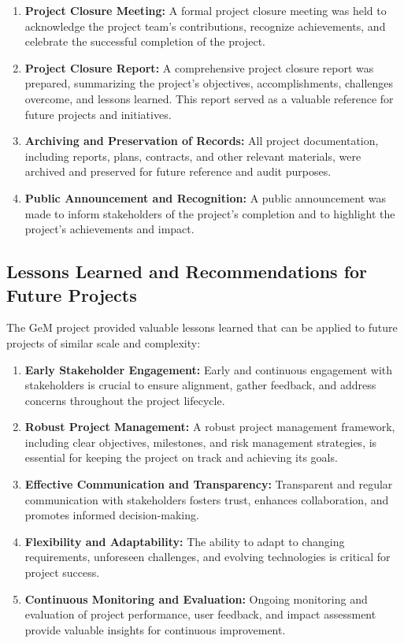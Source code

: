 \begin{enumerate}
    \item \textbf{Project Closure Meeting:} A formal project closure meeting was held to acknowledge the project team's contributions, recognize achievements, and celebrate the successful completion of the project.
    
    \item \textbf{Project Closure Report:} A comprehensive project closure report was prepared, summarizing the project's objectives, accomplishments, challenges overcome, and lessons learned. This report served as a valuable reference for future projects and initiatives.
    
    \item \textbf{Archiving and Preservation of Records:} All project documentation, including reports, plans, contracts, and other relevant materials, were archived and preserved for future reference and audit purposes.
    
    \item \textbf{Public Announcement and Recognition:} A public announcement was made to inform stakeholders of the project's completion and to highlight the project's achievements and impact.
\end{enumerate}

\subsection{Lessons Learned and Recommendations for Future Projects}

The GeM project provided valuable lessons learned that can be applied to future projects of similar scale and complexity:

\begin{enumerate}
    \item \textbf{Early Stakeholder Engagement:} Early and continuous engagement with stakeholders is crucial to ensure alignment, gather feedback, and address concerns throughout the project lifecycle.
    
    \item \textbf{Robust Project Management:} A robust project management framework, including clear objectives, milestones, and risk management strategies, is essential for keeping the project on track and achieving its goals.
    
    \item \textbf{Effective Communication and Transparency:} Transparent and regular communication with stakeholders fosters trust, enhances collaboration, and promotes informed decision-making.
    
    \item \textbf{Flexibility and Adaptability:} The ability to adapt to changing requirements, unforeseen challenges, and evolving technologies is critical for project success.
    
    \item \textbf{Continuous Monitoring and Evaluation:} Ongoing monitoring and evaluation of project performance, user feedback, and impact assessment provide valuable insights for continuous improvement.
\end{enumerate}

